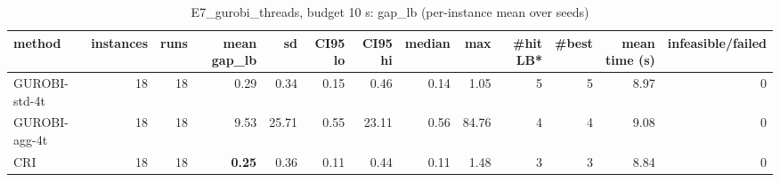 \begin{table}[htbp]
\centering
\small
\caption{E7\_gurobi\_threads, budget 10 s: gap\_lb (per-instance mean over seeds)}
\label{tab:E7_gurobi_threads_b10_summary}
\begin{tabular}{lrrrrrrrrrrrr}
\toprule
method & instances & runs & mean gap\_lb & sd & CI95 lo & CI95 hi & median & max & \#hit LB* & \#best & mean time (s) & infeasible/failed \\
\midrule
GUROBI-std-4t & 18 & 18 & 0.29 & 0.34 & 0.15 & 0.46 & 0.14 & 1.05 & 5 & 5 & 8.97 & 0 \\
GUROBI-agg-4t & 18 & 18 & 9.53 & 25.71 & 0.55 & 23.11 & 0.56 & 84.76 & 4 & 4 & 9.08 & 0 \\
CRI & 18 & 18 & \textbf{0.25} & 0.36 & 0.11 & 0.44 & 0.11 & 1.48 & 3 & 3 & 8.84 & 0 \\
\bottomrule
\end{tabular}
\end{table}
